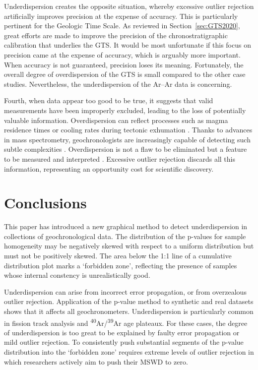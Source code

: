 \documentclass{article}
\begin{document}
Underdispersion creates the opposite situation, whereby excessive
outlier rejection artificially improves precision at the expense of
accuracy. This is particularly pertinent for the Geologic Time Scale.
As reviewed in Section~\ref{sec:GTS2020}, great efforts are made to
improve the precision of the chronostratigraphic calibration that
underlies the GTS. It would be most unfortunate if this focus on
precision came at the expense of accuracy, which is arguably more
important. When accuracy is not guaranteed, precision loses its
meaning. Fortunately, the overall degree of overdispersion of the GTS
is small compared to the other case studies. Nevertheless, the
underdispersion of the Ar--Ar data is concerning.\medskip

Fourth, when data appear too good to be true, it suggests that valid
measurements have been improperly excluded, leading to the loss of
potentially valuable information. Overdispersion can reflect processes
such as magma residence times \citep{rioux2012} or cooling rates
during tectonic exhumation \citep{galbraith1993}. Thanks to advances
in mass spectrometry, geochronologists are increasingly capable of
detecting such subtle complexities
\citep{phillips2013}. Overdispersion is not a flaw to be eliminated
but a feature to be measured and interpreted
\citep{kalsbeek1992,vermeesch2025c}. Excessive outlier rejection
discards all this information, representing an opportunity cost for
scientific discovery.

\section{Conclusions}

This paper has introduced a new graphical method to detect
underdispersion in collections of geochronological data.  The
distribution of the p-values for sample homogeneity may be negatively
skewed with respect to a uniform distribution but must not be
positively skewed. The area below the 1:1 line of a cumulative
distribution plot marks a `forbidden zone', reflecting the presence of
samples whose internal constency is unrealistically good.\medskip

Underdispersion can arise from incorrect error propagation, or from
overzealous outlier rejection. Application of the p-value method to
synthetic and real datasets shows that it affects all
geochronometers. Underdispersion is particularly common in fission
track analysis and \textsuperscript{40}Ar/\textsuperscript{39}Ar age
plateaux.  For these cases, the degree of underdispersion is too great
to be explained by faulty error propagation or mild outlier
rejection. To consistently push substantial segments of the p-value
distribution into the `forbidden zone' requires extreme levels of
outlier rejection in which researchers actively aim to push their MSWD
to zero.\medskip
\end{document}
